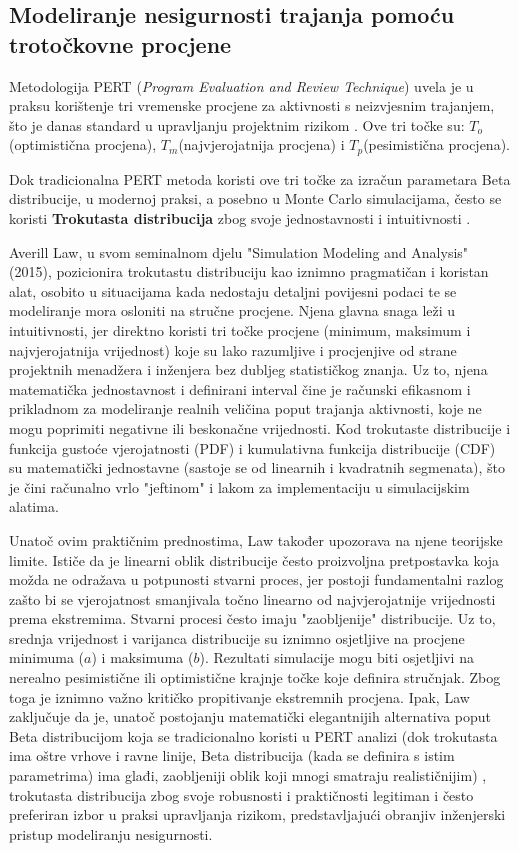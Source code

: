 \subsection{Modeliranje nesigurnosti trajanja pomoću trotočkovne procjene}
\label{sec:triangular}
Metodologija PERT (\textit{Program Evaluation and Review Technique}) uvela je u praksu korištenje tri vremenske procjene za aktivnosti s neizvjesnim trajanjem, što je danas standard u upravljanju projektnim rizikom \cite{Malcolm1959}. Ove tri točke su: $T_o$(optimistična procjena), $T_m$(najvjerojatnija procjena) i $T_p$(pesimistična procjena).

Dok tradicionalna PERT metoda koristi ove tri točke za izračun parametara Beta distribucije, u modernoj praksi, a posebno u Monte Carlo simulacijama, često se koristi \textbf{Trokutasta distribucija} zbog svoje jednostavnosti i intuitivnosti \cite{Law2015}. 

Averill Law, u svom seminalnom djelu "Simulation Modeling and Analysis" (2015), pozicionira trokutastu distribuciju kao iznimno pragmatičan i koristan alat, osobito u situacijama kada nedostaju detaljni povijesni podaci te se modeliranje mora osloniti na stručne procjene. Njena glavna snaga leži u intuitivnosti, jer direktno koristi tri točke procjene (minimum, maksimum i najvjerojatnija vrijednost) koje su lako razumljive i procjenjive od strane projektnih menadžera i inženjera bez dubljeg statističkog znanja. Uz to, njena matematička jednostavnost i definirani interval čine je računski efikasnom i prikladnom za modeliranje realnih veličina poput trajanja aktivnosti, koje ne mogu poprimiti negativne ili beskonačne vrijednosti. Kod trokutaste distribucije i funkcija gustoće vjerojatnosti (PDF) i kumulativna funkcija distribucije (CDF) su matematički jednostavne (sastoje se od linearnih i kvadratnih segmenata), što je čini računalno vrlo "jeftinom" i lakom za implementaciju u simulacijskim alatima. 

Unatoč ovim praktičnim prednostima, Law također upozorava na njene teorijske limite. Ističe da je linearni oblik distribucije često proizvoljna pretpostavka koja možda ne odražava u potpunosti stvarni proces, jer  postoji fundamentalni razlog zašto bi se vjerojatnost smanjivala točno linearno od najvjerojatnije vrijednosti prema ekstremima. Stvarni procesi često imaju "zaobljenije" distribucije. Uz to, srednja vrijednost i varijanca distribucije su iznimno osjetljive na procjene minimuma ($a$) i maksimuma ($b$). Rezultati simulacije mogu biti osjetljivi na nerealno pesimistične ili optimistične krajnje točke koje definira stručnjak. Zbog toga je iznimno važno kritičko propitivanje ekstremnih procjena. Ipak, Law zaključuje da je, unatoč postojanju matematički elegantnijih alternativa poput Beta distribucijom koja se tradicionalno koristi u PERT analizi (dok trokutasta ima oštre vrhove i ravne linije, Beta distribucija (kada se definira s istim parametrima) ima glađi, zaobljeniji oblik koji mnogi smatraju realističnijim) , trokutasta distribucija zbog svoje robusnosti i praktičnosti legitiman i često preferiran izbor u praksi upravljanja rizikom, predstavljajući obranjiv inženjerski pristup modeliranju nesigurnosti.

